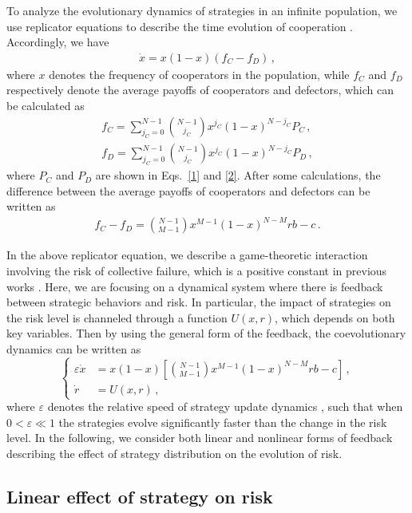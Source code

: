 \documentclass[9pt]{elife}
\begin{document}
To analyze the evolutionary dynamics of strategies in an infinite population, we use replicator equations to describe the time evolution of cooperation \citep{taylor1978evolutionary,schuster1983replicator}. Accordingly, we have
\begin{eqnarray*}
\dot{x}=x(1-x)(f_{C}-f_{D})\,,
\end{eqnarray*}
where $x$ denotes the frequency of cooperators in the population, while $f_{C}$ and $f_{D}$ respectively denote the average payoffs of cooperators and defectors, which can be calculated as
\begin{eqnarray*}
f_{C}=\sum_{j_{C}=0}^{N-1}\binom{N-1}{j_{C}}x^{j_{C}}(1-x)^{N-j_{C}}P_{C}\,,\\
f_{D}=\sum_{j_{C}=0}^{N-1}\binom{N-1}{j_{C}}x^{j_{C}}(1-x)^{N-j_{C}}P_{D}\,,
\end{eqnarray*}
where $P_{C}$ and $P_{D}$ are shown in Eqs.~\eqref{1} and \eqref{2}. After some calculations, the difference between the average payoffs of cooperators and defectors can be written as
\begin{eqnarray*}
f_{C}-f_{D}=\binom{N-1}{M-1}x^{M-1}(1-x)^{N-M}rb-c\,.
\end{eqnarray*}

In the above replicator equation, we describe a game-theoretic interaction involving the risk of collective failure, which is a positive constant in previous works \citep{santos2011risk,chen2012risk}. Here, we are focusing on a dynamical system where there is feedback between strategic behaviors and risk. In particular, the impact of strategies on the risk level is channeled through a function $U(x,r)$, which depends on both key variables. Then by using the general form of the feedback, the coevolutionary dynamics can be written as
\begin{equation}
\left\{
\begin{aligned}
\varepsilon\dot{x}&=x(1-x)[\binom{N-1}{M-1}x^{M-1}(1-x)^{N-M}rb-c]\,,\\
\dot{r}&=U(x,r)\,,
\end{aligned}
\right.
\end{equation}
where $\varepsilon$ denotes the relative speed of strategy update dynamics \citep{weitz2016oscillating}, such that when $0<\varepsilon\ll 1$ the strategies evolve significantly faster than the change in the risk level. In the following, we consider both linear and nonlinear forms of feedback describing the effect of strategy distribution on the evolution of risk.

\subsection{Linear effect of strategy on risk}
\end{document}
